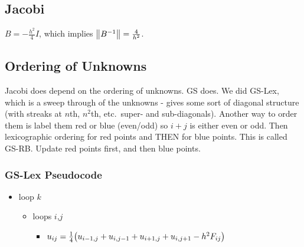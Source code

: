 \documentclass{article}
\begin{document}
        \subsection{Jacobi}
            $B = -\frac{h^2}{4}I$, which implies $\norm{B^{-1}} = \frac{4}{h^2}$.

        \subsection{Ordering of Unknowns}
            Jacobi does depend on the ordering of unknowns.  GS does.  We did GS-Lex, which is a sweep through of the unknowns - gives some sort of diagonal structure (with streaks at $n$th, $n^2$th, etc.~super- and sub-diagonals).  Another way to order them is label them {\color{red}red} or {\color{blue}blue} (even/odd) so $i + j$ is either even or odd.  Then lexicographic ordering for {\color{red}red} points and THEN for {\color{blue}blue} points.  This is called GS-RB.  Update {\color{red}red} points first, and then {\color{blue}blue} points.

            \subsubsection{GS-Lex Pseudocode}
            \begin{itemize}
                \item loop $k$
                \begin{itemize}
                    \item loops $i$,$j$
                    \begin{itemize}
                        \item $u_{ij} = \frac{1}{4}\qty(u_{i-1,j} + u_{i,j-1} + u_{i+1,j} + u_{i,j+1} - h^2F_{ij})$
                    \end{itemize}
                \end{itemize}
            \end{itemize}
\end{document}
